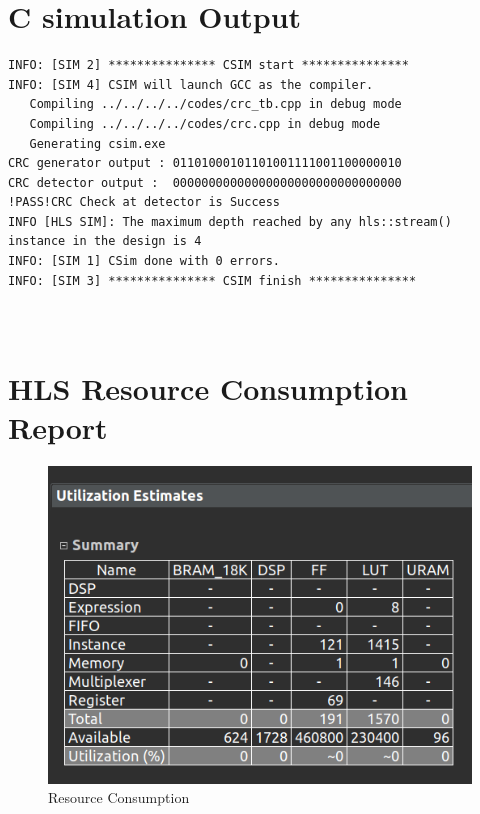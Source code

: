 \documentclass{article}
\begin{document}
\section{C simulation Output}
\begin{lstlisting}
INFO: [SIM 2] *************** CSIM start ***************
INFO: [SIM 4] CSIM will launch GCC as the compiler.
   Compiling ../../../../codes/crc_tb.cpp in debug mode
   Compiling ../../../../codes/crc.cpp in debug mode
   Generating csim.exe
CRC generator output : 01101000101101001111001100000010
CRC detector output :  00000000000000000000000000000000
!PASS!CRC Check at detector is Success
INFO [HLS SIM]: The maximum depth reached by any hls::stream() instance in the design is 4
INFO: [SIM 1] CSim done with 0 errors.
INFO: [SIM 3] *************** CSIM finish ***************



\end{lstlisting}
\vspace{15cm}

\section{HLS Resource Consumption Report}
\vspace{1cm}
\begin{figure}[h]
\centering
\includegraphics[width=\textwidth]{figs/p11.png}
    \caption{Resource Consumption}
    \label{fig:my_label}
\end{figure}

\vspace{13cm}
\end{document}

